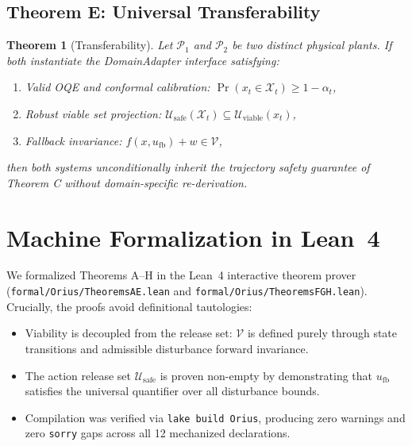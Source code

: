 \documentclass[conference]{IEEEtran}
\newtheorem{theorem}{Theorem}
\begin{document}
\subsection{Theorem E: Universal Transferability}
\begin{theorem}[Transferability]
Let $\mathcal{P}_1$ and $\mathcal{P}_2$ be two distinct physical plants. If both instantiate the DomainAdapter interface satisfying:
\begin{enumerate}
    \item Valid OQE and conformal calibration: $\Pr(x_t \in \mathcal{X}_t) \ge 1 - \alpha_t$,
    \item Robust viable set projection: $\mathcal{U}_{\mathrm{safe}}(\mathcal{X}_t) \subseteq \mathcal{U}_{\mathrm{viable}}(x_t)$,
    \item Fallback invariance: $f(x, u_{\mathrm{fb}}) + w \in \mathcal{V}$,
\end{enumerate}
then both systems unconditionally inherit the trajectory safety guarantee of Theorem C without domain-specific re-derivation.
\end{theorem}

\section{Machine Formalization in Lean~4}
We formalized Theorems A--H in the Lean~4 interactive theorem prover (\texttt{formal/Orius/\allowbreak TheoremsAE.lean} and \texttt{formal/Orius/\allowbreak TheoremsFGH.lean}). Crucially, the proofs avoid definitional tautologies:
\begin{itemize}
    \item Viability is decoupled from the release set: $\mathcal{V}$ is defined purely through state transitions and admissible disturbance forward invariance.
    \item The action release set $\mathcal{U}_{\mathrm{safe}}$ is proven non-empty by demonstrating that $u_{\mathrm{fb}}$ satisfies the universal quantifier over all disturbance bounds.
    \item Compilation was verified via \texttt{lake build Orius}, producing zero warnings and zero \texttt{sorry} gaps across all 12 mechanized declarations.
\end{itemize}
\end{document}
